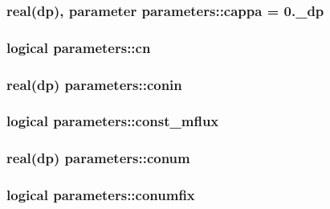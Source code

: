 \hypertarget{classparameters_a896e84304cf2cdc6706c0c14f606bf18}{
\subsubsection[{cappa}]{\setlength{\rightskip}{0pt plus 5cm}real(dp), parameter parameters\-::cappa = 0.\-\_\-dp}}\label{classparameters_a896e84304cf2cdc6706c0c14f606bf18}
\hypertarget{classparameters_aba97e1d2ea3cabe48d1d4a4d23f45cbd}{
\subsubsection[{cn}]{\setlength{\rightskip}{0pt plus 5cm}logical parameters\-::cn}}\label{classparameters_aba97e1d2ea3cabe48d1d4a4d23f45cbd}
\hypertarget{classparameters_a7d26dcf88ea12b562501c00df01a69cb}{
\subsubsection[{conin}]{\setlength{\rightskip}{0pt plus 5cm}real(dp) parameters\-::conin}}\label{classparameters_a7d26dcf88ea12b562501c00df01a69cb}
\hypertarget{classparameters_ae155d0348d784d1ce8b494e2cc214200}{
\subsubsection[{const\-\_\-mflux}]{\setlength{\rightskip}{0pt plus 5cm}logical parameters\-::const\-\_\-mflux}}\label{classparameters_ae155d0348d784d1ce8b494e2cc214200}
\hypertarget{classparameters_abd548d67fa8e554f370eb11f79ac900e}{
\subsubsection[{conum}]{\setlength{\rightskip}{0pt plus 5cm}real(dp) parameters\-::conum}}\label{classparameters_abd548d67fa8e554f370eb11f79ac900e}
\hypertarget{classparameters_a84c9786af35a9874091df85c6af2ec7b}{
\subsubsection[{conumfix}]{\setlength{\rightskip}{0pt plus 5cm}logical parameters\-::conumfix}}\label{classparameters_a84c9786af35a9874091df85c6af2ec7b}
